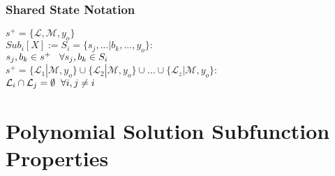 \documentclass[11pt]{article}
\begin{document}
\subsubsection{Shared State Notation}
\begin{center}
\vspace{1mm}
$
s^+ = \{ \mathcal{L},\mathcal{M},y_o\}
$
\\ \vspace{6mm}
$
Sub_i[X] := S_i = \{s_j,...|b_k,...,y_o\}:
$
\\ \vspace{2mm}
$
s_j,b_k \in s^+ \hspace{3mm} \forall s_j,b_k \in S_i
$
\\ \vspace{6mm}
$
s^+ = \{ \mathcal{L}_1| \mathcal{M},y_o\} \cup \{  \mathcal{L}_2| \mathcal{M},y_o\} \cup ... \cup \{  \mathcal{L}_z| \mathcal{M},y_o\} :
$
\\ \vspace{2mm}
$
\mathcal{L}_i \cap \mathcal{L}_j = \emptyset \hspace{2mm} \forall i,j\neq i
$
\end{center}









\newpage

\section{Polynomial Solution Subfunction Properties}
\end{document}
